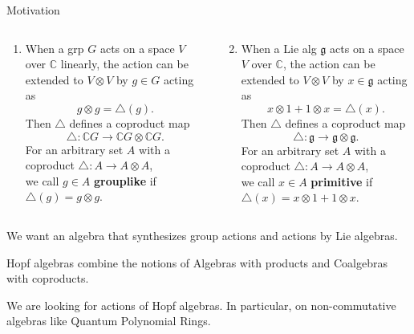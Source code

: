 \documentclass{beamer}
\newcommand\1{_{(1)}}
\newcommand\2{_{(2)}}
\begin{document}
\begin{frame}{Motivation}
\begin{columns}[T]
\begin{column}{0.6\textwidth}
\begin{enumerate}\setlength{\itemindent}{-2ex}
    \item<1-> When a grp $G$ acts on a space $V$ over $\mathbb{C}$ linearly, the action can be extended to $V\otimes V$ by $g\in G$ acting as \[g\otimes g=\triangle(g).\] 
     Then $\triangle$ defines a coproduct map \[\triangle:\mathbb{C}G\to\mathbb{C}G\otimes\mathbb{C}G.\]
     For an arbitrary set $A$ with a coproduct $\triangle:A\to A\otimes A$, \\we call $g\in A$ \textbf{grouplike} if $\triangle(g)=g\otimes g$.
\end{enumerate}
\end{column}\hspace{-2ex}\vrule\begin{column}{0.58\textwidth}
\begin{enumerate}
    \setcounter{enumi}{1}
     \item<2-> When a Lie alg $\mathfrak{g}$ acts on a space $V$ over $\mathbb{C}$, the action can be extended to $V\otimes V$ by $x\in\mathfrak{g}$ acting as \[x\otimes 1+1\otimes x=\triangle(x).\]
      Then $\triangle$ defines a coproduct map \[\triangle:\mathfrak{g}\to\mathfrak{g}\otimes\mathfrak{g}.\]
      For an arbitrary set $A$ with a coproduct $\triangle:A\to A\otimes A$,\\ we call $x\in A$ \textbf{primitive} if $\triangle(x)=x\otimes 1+1\otimes x$.
\end{enumerate}
\end{column}
\end{columns}
\vspace{0.5cm}
\end{frame}

\begin{frame}{}
    \begin{beamerboxesrounded}{}{}
        \begin{center}
            We want an algebra that synthesizes group actions and actions by Lie algebras.
        \end{center}
    \end{beamerboxesrounded}
    \begin{beamerboxesrounded}{}{}
        \begin{center}
    Hopf algebras combine the notions of Algebras with products and Coalgebras with coproducts.
        \end{center}
    \begin{center}We are looking for actions of Hopf algebras.
    In particular, on non-commutative algebras like Quantum Polynomial Rings.    
        \end{center}       
    \end{beamerboxesrounded}
\end{frame}
\end{document}
